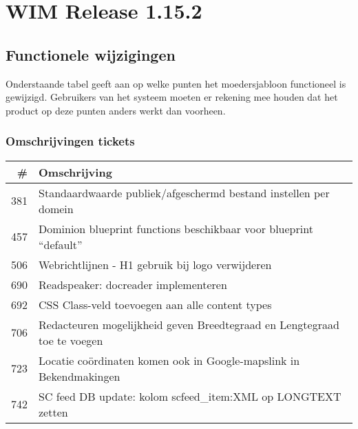 

\newcommand{\release}{1.15.2}
\newcommand{\projectname}{WIM Release \release}

\newcommand{\customer}{Dimpact} %
\newcommand{\customershort}{Dimpact} %

\newcommand{\customerdomain}{dimpact.nl}
\newcommand{\authors}{R. Meijer}
\newcommand{\lastversion}{1.0}
\newcommand{\lastupdate}{18-05-2016}






\tableofcontents
\pagebreak



\section{\projectname} %
\label{sec:release}


\subsection{Functionele wijzigingen} %
\label{sub:functionele_wijzigingen}

Onderstaande tabel geeft aan op welke punten het moedersjabloon functioneel is gewijzigd. Gebruikers van het systeem moeten er rekening mee houden dat het product op deze punten anders werkt dan voorheen.

\subsubsection{Omschrijvingen tickets} %
\label{ssub:omschrijvingen_tickets}

\begin{tabular}{ r | p{15cm} } \hline
  \textbf{\#} & \textbf{Omschrijving} \\ \hline
  381 & Standaardwaarde publiek/afgeschermd bestand instellen per domein \\ \hline
  457 & Dominion blueprint functions beschikbaar voor blueprint ``default'' \\ \hline
  506 & Webrichtlijnen - H1 gebruik bij logo verwijderen \\ \hline
  690 & Readspeaker: docreader implementeren \\ \hline
  692 & CSS Class-veld toevoegen aan alle content types \\ \hline
  706 & Redacteuren mogelijkheid geven Breedtegraad en Lengtegraad toe te voegen \\ \hline
  723 & Locatie co\"ordinaten komen ook in Google-mapslink in Bekendmakingen \\ \hline
  742 & SC feed DB update: kolom scfeed\_item:XML op LONGTEXT zetten \\ \hline
\end{tabular}

